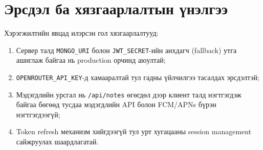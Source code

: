 \section{Эрсдэл ба хязгаарлалтын үнэлгээ}
\label{sec:risk_and_limits}

Хэрэгжилтийн явцад илэрсэн гол хязгаарлалтууд:

\begin{enumerate}
    \item Сервер талд \texttt{MONGO\_URI} болон \texttt{JWT\_SECRET}-ийн анхдагч (fallback) утга ашиглаж байгаа нь production орчинд аюултай;
    \item \texttt{OPENROUTER\_API\_KEY}-д хамааралтай тул гадны үйлчилгээ тасалдах эрсдэлтэй;
    \item Мэдэгдлийн урсгал нь \texttt{/api/notes} өгөгдөл дээр клиент талд нэгтгэгдэж байгаа бөгөөд тусдаа мэдэгдлийн API болон FCM/APNs бүрэн нэгтгэгдээгүй;
    \item Token refresh механизм хийгдээгүй тул урт хугацааны session management сайжруулах шаардлагатай.
\end{enumerate}
